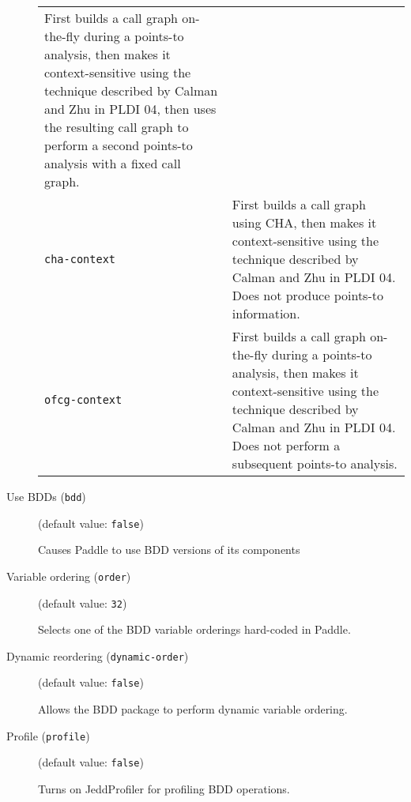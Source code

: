 \documentclass{article}
\begin{document}
\begin{description}
\begin{longtable}{p{1in}p{4in}}
First builds a call graph on-the-fly during a points-to analysis, then
makes it context-sensitive using the technique described by Calman and
Zhu in PLDI 04, then uses the resulting call graph to perform a second
points-to analysis with a fixed call graph.
\\

{\tt cha-context }
&

First builds a call graph using CHA, then makes it context-sensitive using
the technique described by Calman and Zhu in PLDI 04. Does not produce
points-to information.
\\

{\tt ofcg-context }
&

First builds a call graph on-the-fly during a points-to analysis, then
makes it context-sensitive using the technique described by Calman and
Zhu in PLDI 04. Does not perform a subsequent points-to analysis.
\\

\end{longtable}


\item[Use BDDs ({\tt bdd})]
(default value: {\tt false})




                                                        Causes Paddle to use BDD versions of its components
        


\item[Variable ordering ({\tt order})]
(default value: {\tt 32})




                                        Selects one of the BDD variable orderings hard-coded in Paddle.
                


\item[Dynamic reordering ({\tt dynamic-order})]
(default value: {\tt false})




                                        Allows the BDD package to perform dynamic variable ordering.
                


\item[Profile ({\tt profile})]
(default value: {\tt false})




Turns on JeddProfiler for profiling BDD operations.
        



\end{description}
\end{document}
